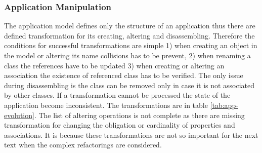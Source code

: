 \documentclass[runningheads]{comsis}
\begin{document}
\subsubsection{Application Manipulation}
\label{sec:app-evolution}
The application model defines only the structure of an application thus there are defined transformation for its creating, altering and disassembling. Therefore the conditions for successful transformations are simple 1) when creating an object in the model or altering its name collisions has to be prevent, 2) when renaming a class the references have to be updated 3) when creating or altering an association the existence of referenced class has to be verified. The only issue during disassembling is the class can be removed only in case it is not associated by other classes. If a transformation cannot be processed the state of the application become inconsistent. The transformations are in table \ref{tab:app-evolution}. The list of altering operations is not complete as there are missing transformation for changing the obligation or cardinality of properties and associations. It is because these transformations are not so important for the next text when the complex refactorings are considered. 
\end{document}
